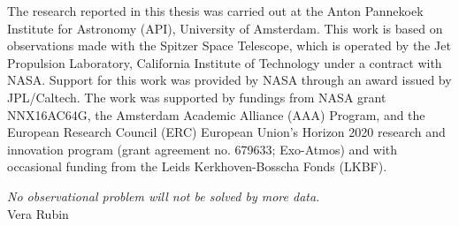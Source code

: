 {\small The research reported in this thesis was carried out at the Anton Pannekoek Institute for Astronomy (API), University of Amsterdam.
This work is based on observations made with the Spitzer Space Telescope, which is operated by the Jet Propulsion Laboratory, California Institute of Technology under a contract with NASA. Support for this work was provided by NASA through an award issued by JPL/Caltech.
The work was supported by fundings from NASA grant NNX16AC64G, the Amsterdam Academic Alliance (AAA) Program, and the European Research Council (ERC) European Union’s Horizon 2020 research and innovation program (grant agreement no. 679633; Exo-Atmos) and with occasional funding from the Leids Kerkhoven-Bosscha Fonds (LKBF).} \vspace{0.5em}

\clearpage

\thispagestyle{empty}
\null\vfill\null
\hfill\parbox{110mm}{
  \raggedleft
    \emph{\large No observational problem will not be solved by more data.}\\[5pt]
  Vera Rubin
}
\null\vfill\null
\clearpage
\thispagestyle{empty}
\newpage
\phantom{let's kill those trees}

\pagestyle{fancy}
\setlength\parindent{15pt}


